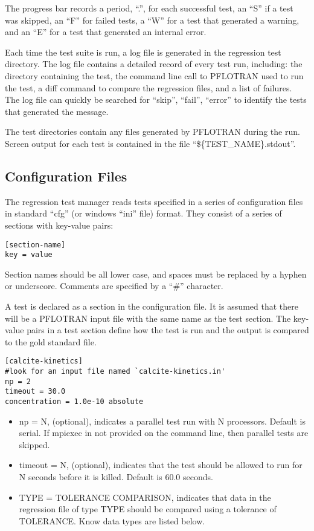 The progress bar records a period, ``.'', for each successful test, an
``S'' if a test was skipped, an ``F'' for failed tests, a ``W'' for a
test that generated a warning, and an ``E'' for a test that generated
an internal error.

Each time the test suite is run, a log file is generated in the
regression test directory. The log file contains a detailed record of
every test run, including: the directory containing the test, the
command line call to PFLOTRAN used to run the test, a diff command to
compare the regression files, and a list of failures. The log file can
quickly be searched for ``skip'', ``fail'', ``error'' to identify the
tests that generated the message.

The test directories contain any files generated by PFLOTRAN during
the run. Screen output for each test is contained in the file
``\$\{TEST\_NAME\}.stdout''.



\subsection{Configuration Files}
The regression test manager reads tests specified in a series of
configuration files in standard ``cfg'' (or windows ``ini'' file)
format. They consist of a series of sections with key-value pairs:
\begin{verbatim}
[section-name]
key = value
\end{verbatim}
Section names should be all lower case, and spaces must be replaced by
a hyphen or underscore. Comments are specified by a ``\#'' character.

A test is declared as a section in the configuration file. It is assumed that
there will be a PFLOTRAN input file with the same name as the test
section. The key-value pairs in a test section define how the test is
run and the output is compared to the gold standard file. 
\begin{verbatim}
[calcite-kinetics]
#look for an input file named `calcite-kinetics.in'
np = 2
timeout = 30.0
concentration = 1.0e-10 absolute
\end{verbatim}

\begin{itemize}
\item np = N, (optional), indicates a parallel test run with N
  processors. Default is serial. If mpiexec in not provided on the
  command line, then parallel tests are skipped.
\item timeout = N, (optional), indicates that the test should be allowed to run
  for N seconds before it is killed. Default is 60.0 seconds.
\item TYPE = TOLERANCE COMPARISON, indicates that data in the
  regression file of type TYPE should be compared using a tolerance of
  TOLERANCE. Know data types are listed below.
\end{itemize}


